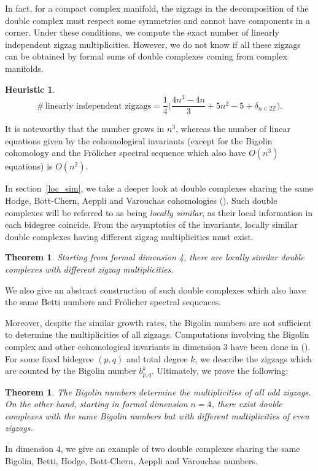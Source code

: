 \documentclass[leqno]{article}
\newtheorem{Theorem}[equation]{Theorem}
\newtheorem*{Heuristic}{Heuristic}
\theoremstyle{definition}
\numberwithin{equation}{section}
\begin{document}
In fact, for a compact complex manifold, the zigzags in the decomposition of the double complex must respect some symmetries and cannot have components in a corner. Under these conditions, we compute the exact number of linearly independent zigzag multiplicities. However, we do not know if all these zigzags can be obtained by formal sums of double complexes coming from complex manifolds.
\begin{Heuristic}
\[
\# \, \text{linearly independent zigzags}
=
\frac{1}{4}
\Big(
\frac{4n^3 - 4n}{3}
+5n^2
- 5
+ \delta_{n \in 2\mathbb{Z}}
\Big).
\]
\end{Heuristic}
 It is noteworthy that the number grows in $n^3$, whereas the number of linear equations given by the cohomological invariants (except for the Bigolin cohomology and the Frölicher spectral sequence which also have $O(n^3)$ equations) is $O(n^2)$.

In section~\ref{loc_sim}, we take a deeper look at double complexes sharing the same Hodge, Bott-Chern, Aeppli and Varouchas cohomologies (\cite{JV}). Such double complexes will be referred to as being {\sl locally similar}, as their local information in each bidegree coincide. From the asymptotics of the invariants, locally similar double complexes having different zigzag multiplicities must exist. 
\begin{Theorem}
Starting from formal dimension 4, there are locally similar double complexes with different zigzag multiplicities.
\end{Theorem}
We also give an abstract construction 
of such double complexes which also have the same Betti numbers and Frölicher spectral sequences.

Moreover, despite the similar growth rates, the Bigolin numbers are not sufficient to determine the multiplicities of all zigzags. 
Computations involving the Bigolin complex and other cohomological invariants in dimension $3$ 
have been done in (\cite{Piovani}). For some fixed bidegree $(p, q)$ and total degree $k$, 
we describe the zigzags which are counted by the Bigolin number $b^k_{p, q}$. 
Ultimately, we prove the following:
\begin{Theorem}
The Bigolin numbers determine the multiplicities of all odd zigzags. On the other hand, starting in formal dimension $n = 4$, there exist double complexes with the same Bigolin numbers but with different multiplicities of even zigzags.
\end{Theorem}
In dimension $4$, we give an example of two double complexes sharing the same Bigolin, Betti, Hodge, Bott-Chern, Aeppli and Varouchas numbers.
\end{document}
